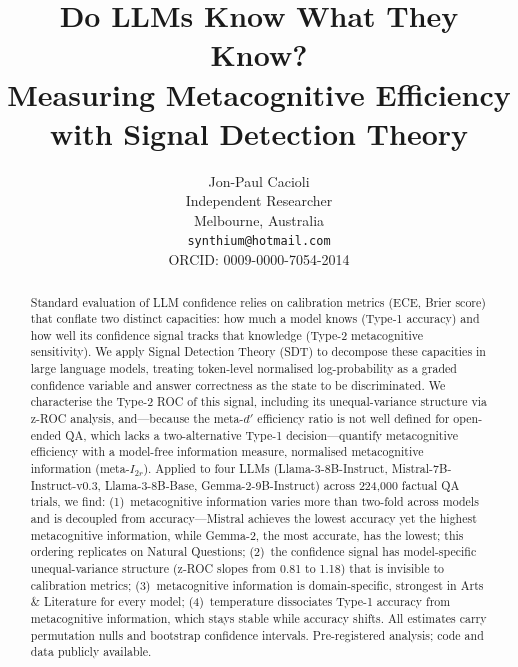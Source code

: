\documentclass{article}
\title{Do LLMs Know What They Know? \\Measuring Metacognitive Efficiency with Signal Detection Theory}
\author{%
  Jon-Paul Cacioli \\
  Independent Researcher \\
  Melbourne, Australia \\
  \texttt{synthium@hotmail.com} \\
  ORCID: 0009-0000-7054-2014
}
\begin{document}
\maketitle

\begin{abstract}
Standard evaluation of LLM confidence relies on calibration metrics (ECE, Brier score) that conflate two distinct capacities: how much a model knows (Type-1 accuracy) and how well its confidence signal tracks that knowledge (Type-2 metacognitive sensitivity). We apply Signal Detection Theory (SDT) to decompose these capacities in large language models, treating token-level normalised log-probability as a graded confidence variable and answer correctness as the state to be discriminated. We characterise the Type-2 ROC of this signal, including its unequal-variance structure via z-ROC analysis, and---because the meta-$d'$ efficiency ratio is not well defined for open-ended QA, which lacks a two-alternative Type-1 decision---quantify metacognitive efficiency with a model-free information measure, normalised metacognitive information (meta-$I_{2r}$). Applied to four LLMs (Llama-3-8B-Instruct, Mistral-7B-Instruct-v0.3, Llama-3-8B-Base, Gemma-2-9B-Instruct) across 224{,}000 factual QA trials, we find: (1)~metacognitive information varies more than two-fold across models and is decoupled from accuracy---Mistral achieves the lowest accuracy yet the highest metacognitive information, while Gemma-2, the most accurate, has the lowest; this ordering replicates on Natural Questions; (2)~the confidence signal has model-specific unequal-variance structure (z-ROC slopes from 0.81 to 1.18) that is invisible to calibration metrics; (3)~metacognitive information is domain-specific, strongest in Arts \& Literature for every model; (4)~temperature dissociates Type-1 accuracy from metacognitive information, which stays stable while accuracy shifts. All estimates carry permutation nulls and bootstrap confidence intervals. Pre-registered analysis; code and data publicly available.
\end{abstract}

\end{document}
